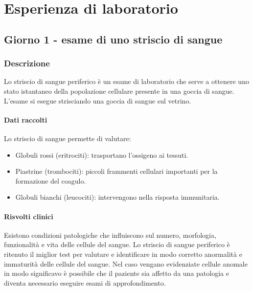 \chapter{Esperienza di laboratorio}
\section{Giorno 1 - esame di uno striscio di sangue}

	\subsection{Descrizione}
	Lo striscio di sangue periferico \`e un esame di laboratorio che serve a ottenere uno stato istantaneo della popolazione cellulare presente in una goccia di sangue. 
	L'esame si esegue strisciando una goccia di sangue sul vetrino. 

		\subsubsection{Dati raccolti}
		Lo striscio di sangue permette di valutare:
		\begin{itemize}
			\item Globuli rossi (eritrociti): trasportano l'ossigeno ai tessuti.
			\item Piastrine (trombociti): piccoli frammenti cellulari importanti per la formazione del coagulo.
			\item Globuli bianchi (leucociti): intervengono nella risposta immunitaria.
		\end{itemize}

		\subsubsection{Risvolti clinici}
		Esistono condizioni patologiche che influiscono sul numero, morfologia, funzionalit\`a e vita delle cellule del sangue. 
		Lo striscio di sangue periferico \`e ritenuto il miglior test per valutare e identificare in modo corretto anormalit\`a e immaturit\`a delle cellule del sangue. 
		Nel caso vengano evidenziate cellule anomale in modo significavo \`e possibile che il paziente sia affetto da una patologia e diventa necessario eseguire esami di approfondimento.

